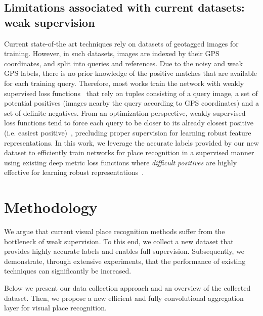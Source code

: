 \documentclass{article}
\begin{document}
\subsection{Limitations associated with current datasets: weak supervision}
Current state-of-the art techniques \cite{arandjelovic2016netvlad, kim2017learned, seymour2019semantically, liu2019stochastic, ge2020self, leyva2021generalized, hausler2021patch} rely on datasets of geotagged images for training. However, in such datasets, images are indexed by their GPS coordinates, and split into queries and references. Due to the noisy and weak GPS labels, there is no prior knowledge of the positive matches that are available for each training query. Therefore, most works train the network with weakly supervised loss functions~\cite{arandjelovic2016netvlad} that rely on tuples consisting of a query image, a set of potential positives (images nearby the query according to GPS coordinates) and a set of definite negatives. From an optimization perspective, weakly-supervised loss functions tend to force each query to be closer to its already closest positive (i.e. easiest positive)~\cite{ge2020self}, precluding proper supervision for learning robust feature representations. In this work, we leverage the accurate labels provided by our new dataset to efficiently train networks for place recognition in a supervised manner using existing deep metric loss functions where \emph{difficult positives} are highly effective for learning robust representations~\cite{kaya2019deep}.





\section{Methodology}
We argue that current visual place recognition methods suffer from the bottleneck of weak supervision. To this end, we collect a new dataset that provides highly accurate labels and enables full supervision. Subsequently, we demonstrate, through extensive experiments, that the performance of existing techniques can significantly be increased.

Below we present our data collection approach and an overview of the collected dataset. Then, we propose a new efficient and fully convolutional aggregation layer for visual place recognition.
\end{document}
